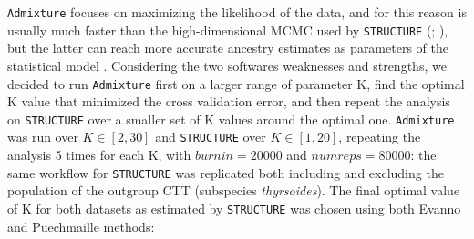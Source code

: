 \documentclass[a4paper, 12pt]{report}
\begin{document}
\texttt{Admixture} focuses on maximizing the likelihood of the data, and for this reason is usually much faster than the high-dimensional MCMC used by \texttt{STRUCTURE}  (\cite{alexanderFastModelbasedEstimation2009}; \cite{alexanderAdmixture13Software2020}), but the latter can reach more accurate ancestry estimates as parameters of the statistical model \parencite{stiftStructureMoreRobust2019}. Considering the two softwares weaknesses and strengths, we decided to run \texttt{Admixture} first on a larger range of parameter K, find the optimal K value that minimized the cross validation error, and then repeat the analysis on \texttt{STRUCTURE} over a smaller set of K values around the optimal one. \texttt{Admixture} was run over $K \in [2,30]$ and \texttt{STRUCTURE} over $K \in [1,20]$, repeating the analysis 5 times for each K, with $burnin = 20000$ and $numreps = 80000$: the same workflow for \texttt{STRUCTURE} was replicated both including and excluding the population of the outgroup CTT (subspecies \textit{thyrsoides}). The final optimal value of K for both datasets as estimated by \texttt{STRUCTURE} was chosen using both Evanno \parencite{evannoDetectingNumberClusters2005} and Puechmaille \parencite{puechmailleProgramStructureDoes2016} methods:
\vspace{-1.5em}
\end{document}

